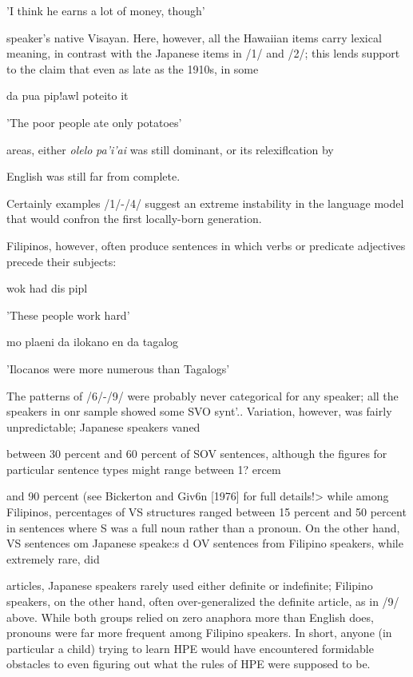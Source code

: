 'I think he earns a lot of money, though'

speaker's native Visayan. Here, however, all the Hawaiian items carry lexical meaning, in contrast with the Japanese items in /1/ and /2/; this lends support to the claim that even as late as the 1910s, in some

\ea\label{ex:7}

\glt
\z

da pua pip!awl poteito it

'The poor people ate only potatoes'

areas, either \textit{olelo} \textit{pa'i'ai }was still dominant, or its relexiflcation by

English was still far from complete.

Certainly examples /1/-/4/ suggest an extreme instability in the language model that would confron the first locally-born generation.

Filipinos, however, often produce sentences in which verbs or predicate adjectives precede their subjects:

\ea\label{ex:8}
wok had dis pipl
\glt
\z

'These people work hard'


\ea\label{ex:9}
mo plaeni da ilokano en da tagalog
\glt
\z

'Ilocanos were more numerous than Tagalogs'

The patterns of /6/-/9/ were probably never categorical for any speaker; all the speakers in onr sample showed some SVO synt'.{\textquotedbl}{\textquotedbl}. Variation, however, was fairly unpredictable; Japanese speakers vaned

between 30 percent and 60 percent of SOV sentences, although the figures for particular sentence types might range between 1? ercem

and 90 percent (see Bickerton and Giv6n [1976] for full details!{\textgreater} while among Filipinos, percentages of VS structures ranged between 15 percent and 50 percent in sentences where S was a full noun rather than a pronoun. On the other hand, VS sentences om Japanese speake:s d OV sentences from Filipino speakers, while extremely rare, did

articles, Japanese speakers rarely used either definite or indefinite; Filipino speakers, on the other hand, often over-generalized the definite article, as in /9/ above. While both groups relied on zero anaphora more than English does, pronouns were far more frequent among Filipino speakers. In short, anyone (in particular a child) trying to learn HPE would have encountered formidable obstacles to even figuring out what the rules of HPE were supposed to be.

